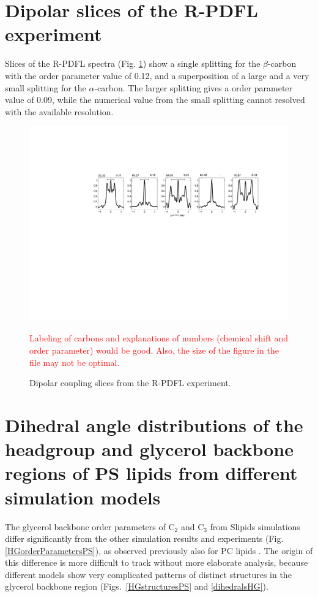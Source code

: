 \documentclass[journal=jpcbfk]{achemso}
\newcommand{\todo}[1]{\textcolor{red}{#1}}
\begin{document}
\pagebreak
\section{Dipolar slices of the R-PDFL experiment}

Slices of the R-PDFL spectra (Fig. \ref{DPslices}) 
show a single splitting for the $\beta$-carbon with the order parameter value of 0.12,
and a superposition of a large and a very small splitting for the $\alpha$-carbon.
The larger splitting gives a order parameter value of 0.09, while the numerical value
from the small splitting cannot resolved with the available resolution.
\begin{figure}[]
  \includegraphics[width=20.0cm]{../Figs/SI_slices.pdf}
  \caption{\label{DPslices}
    Dipolar coupling slices from the R-PDFL experiment.
  }
  \todo{Labeling of carbons and explanations of numbers (chemical shift and order parameter) would be good.
  Also, the size of the figure in the file may not be optimal.}
\end{figure}

\pagebreak
\section{Dihedral angle distributions of the headgroup and glycerol backbone
  regions of PS lipids from different simulation models}

The glycerol backbone order parameters of C$_2$ and C$_3$ from Slipids simulations
differ significantly from the other simulation results and experiments (Fig. \ref{HGorderParametersPS}),
as observed previously also for PC lipids \cite{botan15}.
The origin of this difference is more difficult to track without more elaborate analysis,
because different models show very complicated patterns of distinct structures
in the glycerol backbone region (Figs.~\ref{HGstructuresPS} and \ref{dihedralsHG}).
\end{document}
